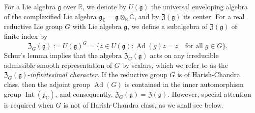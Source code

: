 For a Lie algebra ${\mathfrak{g}}$ over ${\mathbb{R}}$, 
 we denote by 
$U({\mathfrak{g}})$
 the universal enveloping algebra
 of the complexified Lie algebra 
$
   {\mathfrak{g}}_{\mathbb{C}}={\mathfrak{g}} \otimes_{\mathbb{R}} {\mathbb{C}}
$, 
 and by
 ${\mathfrak{Z}}({\mathfrak{g}})$ its center.  
For a real reductive Lie group $G$ with Lie algebra ${\mathfrak{g}}$, 
 we define a subalgebra of ${\mathfrak{Z}}({\mathfrak{g}})$
 of finite index 
 by 
\[
 {\mathfrak{Z}}_G({\mathfrak{g}})
  :=
  U({\mathfrak{g}})^G
  =\{z \in U({\mathfrak{g}}) : 
    {\operatorname{Ad}}(g)z=z
\quad
\text{for all } g \in G\}.  
\]
Schur's lemma implies 
 that the algebra ${\mathfrak{Z}}_G({\mathfrak{g}})$ acts
 on any irreducible admissible smooth representation of $G$
 by scalars, 
 which we refer to as 
 the ${\mathfrak{Z}}_G({\mathfrak{g}})$-{\it{infinitesimal character}}.  
If the reductive group $G$ is of Harish-Chandra class, 
 then the adjoint group ${\operatorname{Ad}}(G)$
 is contained in the inner automorphism group
 ${\operatorname{Int}}({\mathfrak{g}}_{{\mathbb{C}}})$, 
 and consequently, 
 ${\mathfrak{Z}}_G({\mathfrak{g}}) ={\mathfrak{Z}}({\mathfrak{g}})$.  
However, 
 special attention is required 
 when $G$ is not of Harish-Chandra class, 
 as we shall see below.  



